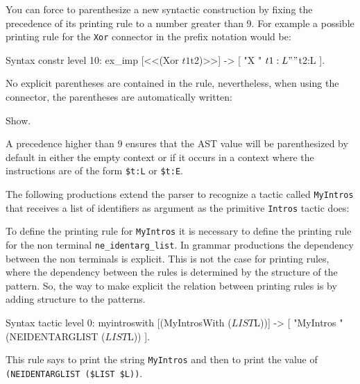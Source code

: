 You can force to parenthesize a new syntactic construction by fixing
the precedence of its printing rule to a number greater than 9. For
example a possible printing rule for the {\tt Xor} connector in the prefix
notation would be:

\begin{coq_example*}
Syntax constr level 10:
  ex_imp [<<(Xor $t1  $t2)>>] -> [ "X " $t1:L " " $t2:L ].
\end{coq_example*}

No explicit parentheses are contained in the rule, nevertheless, when
using the connector, the parentheses are automatically written:

\begin{coq_example}
Show.
\end{coq_example}

A precedence higher than 9 ensures that the AST value will be
parenthesized by default in either the empty context or if it occurs
in a context where the instructions are of the form
\verb+$t:L+ or \verb+$t:E+.



The following productions extend the parser to recognize a
tactic called \verb+MyIntros+ that receives a list of identifiers as
argument as the primitive \verb+Intros+ tactic does:


To define the printing rule for \verb+MyIntros+ it is necessary to
define the printing rule for the non terminal \verb+ne_identarg_list+.
In grammar productions the dependency between the non terminals is
explicit. This is not the case for printing rules, where the
dependency between the rules is determined by the structure of the
pattern. So, the way to make explicit the relation between printing
rules is by adding structure to the patterns.

\begin{coq_example}
Syntax tactic level 0:
  myintroswith [(MyIntrosWith ($LIST $L))] ->
   [ "MyIntros " (NEIDENTARGLIST ($LIST $L)) ].
\end{coq_example}

This rule says to print the string \verb+MyIntros+ and then to print
the value of \\
\verb+(NEIDENTARGLIST ($LIST $L))+.

